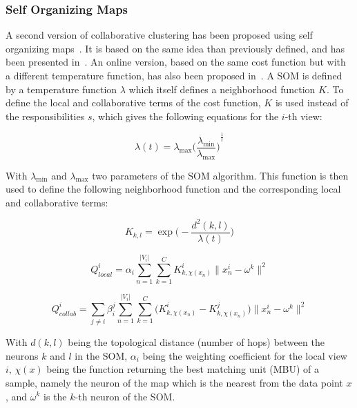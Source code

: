 \documentclass[a4paper]{report}
\begin{document}
    \subsubsection{Self Organizing Maps}

    A second version of collaborative clustering has been proposed using self organizing maps~\cite{kohonen1998self}. It is based on the same idea than previously defined, and has been presented in~\cite{grozavu2010topological}. An online version, based on the same cost function but with a different temperature function, has also been proposed in~\cite{maurel2017incremental}. A SOM is defined by a temperature function $\lambda$ which itself defines a neighborhood function $K$. To define the local and collaborative terms of the cost function, $K$ is used instead of the responsibilities $s$, which gives the following equations for the $i$-th view:

    \begin{equation}
    \lambda(t) = \lambda_{\max}{\Big(\frac{\lambda_{\min}}{\lambda_{\max}}\Big)}^{\frac{1}{t}}
        \label{eq:som_temp}
    \end{equation}

    With $\lambda_{\min}$ and $\lambda_{\max}$ two parameters of the SOM algorithm. This function is then used to define the following neighborhood function and the corresponding local and collaborative terms:

    \begin{equation}
        K_{k,l} = \exp\Big(-\frac{d^2(k,l)}{\lambda(t)}\Big)
        \label{eq:som_neigh}
    \end{equation}

    \begin{equation}
        Q_{local}^i = \alpha_i \sum_{n=1}^{|V_i|}\sum_{k=1}^C K^i_{k,\chi(x_n)}\|x_n^i - \omega^k \|^2 
        \label{eq:som_cc_local}
    \end{equation}

    \begin{equation}
    Q_{collab}^i = \sum_{j \neq i}\beta_i^j \sum_{n=1}^{|V_i|}\sum_{k=1}^C \big(K^i_{k,\chi(x_n)} - K^j_{k,\chi(x_n)}\big)\|x_n^i - \omega^k \|^2 
        \label{eq:som_cc_collab}
    \end{equation}

    With $d(k,l)$ being the topological distance (number of hops) between the neurons $k$ and $l$ in the SOM, $\alpha_i$ being the weighting coefficient for the local view $i$, $\chi(x)$ being the function returning the best matching unit (MBU) of a sample, namely the neuron of the map which is the nearest from the data point $x$, and $\omega^k$ is the $k$-th neuron of the SOM.\@
\end{document}
